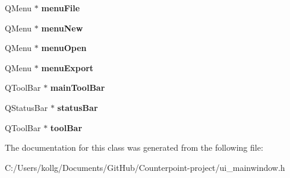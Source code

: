 \begin{DoxyCompactItemize}
\item 
\hypertarget{class_ui___main_window_a7ba84cb4cdd6a12dc83bf4e100bd8d80}{}Q\+Menu $\ast$ {\bfseries menu\+File}\label{class_ui___main_window_a7ba84cb4cdd6a12dc83bf4e100bd8d80}

\item 
\hypertarget{class_ui___main_window_ace6c6ca40028a7bcb6ada6bb864e0941}{}Q\+Menu $\ast$ {\bfseries menu\+New}\label{class_ui___main_window_ace6c6ca40028a7bcb6ada6bb864e0941}

\item 
\hypertarget{class_ui___main_window_adcba5a32ce775ca26d6b10e5affbbff0}{}Q\+Menu $\ast$ {\bfseries menu\+Open}\label{class_ui___main_window_adcba5a32ce775ca26d6b10e5affbbff0}

\item 
\hypertarget{class_ui___main_window_abc8dfc324aee4732812b372fe6733a5f}{}Q\+Menu $\ast$ {\bfseries menu\+Export}\label{class_ui___main_window_abc8dfc324aee4732812b372fe6733a5f}

\item 
\hypertarget{class_ui___main_window_a5172877001c8c7b4e0f6de50421867d1}{}Q\+Tool\+Bar $\ast$ {\bfseries main\+Tool\+Bar}\label{class_ui___main_window_a5172877001c8c7b4e0f6de50421867d1}

\item 
\hypertarget{class_ui___main_window_a50fa481337604bcc8bf68de18ab16ecd}{}Q\+Status\+Bar $\ast$ {\bfseries status\+Bar}\label{class_ui___main_window_a50fa481337604bcc8bf68de18ab16ecd}

\item 
\hypertarget{class_ui___main_window_ab84dc49349f514d7b7d3fe8e78de069b}{}Q\+Tool\+Bar $\ast$ {\bfseries tool\+Bar}\label{class_ui___main_window_ab84dc49349f514d7b7d3fe8e78de069b}

\end{DoxyCompactItemize}


The documentation for this class was generated from the following file\+:\begin{DoxyCompactItemize}
\item 
C\+:/\+Users/kollg/\+Documents/\+Git\+Hub/\+Counterpoint-\/project/ui\+\_\+mainwindow.\+h\end{DoxyCompactItemize}
